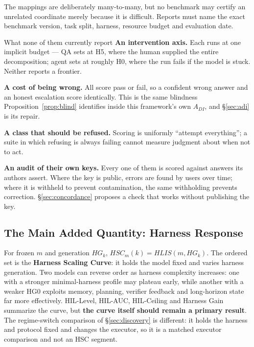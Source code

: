 \documentclass[11pt]{article}
\theoremstyle{definition}
\begin{document}
The mappings are deliberately many-to-many, but no benchmark may certify an unrelated coordinate merely because it is difficult. Reports must name the exact benchmark version, task split, harness, resource budget and evaluation date.

\begin{claimbox}{What none of them currently report}
\textbf{An intervention axis.} Each runs at one implicit budget --- QA sets at H5, where the human supplied the entire decomposition; agent sets at roughly H0, where the run fails if the model is stuck. Neither reports a frontier.

\textbf{A cost of being wrong.} All score pass or fail, so a confident wrong answer and an honest escalation score identically. This is the same blindness Proposition~\ref{prop:blind} identifies inside this framework's own $A_{DI}$, and \S\ref{sec:adi} is its repair.

\textbf{A class that should be refused.} Scoring is uniformly ``attempt everything''; a suite in which refusing is always failing cannot measure judgment about when not to act.

\textbf{An audit of their own keys.} Every one of them is scored against answers its authors assert. Where the key is public, errors are found by users over time; where it is withheld to prevent contamination, the same withholding prevents correction. \S\ref{sec:concordance} proposes a check that works without publishing the key.
\end{claimbox}

\subsection{The Main Added Quantity: Harness Response}

For frozen $m$ and generation $HG_k$, $HSC_m(k) = HLIS(m,HG_k)$. The ordered set is the \textbf{Harness Scaling Curve}: it holds the model fixed and varies harness generation. Two models can reverse order as harness complexity increases: one with a stronger minimal-harness profile may plateau early, while another with a weaker HG0 exploits memory, planning, verifier feedback and long-horizon state far more effectively. HIL-Level, HIL-AUC, HIL-Ceiling and Harness Gain summarize the curve, but \textbf{the curve itself should remain a primary result}. The regime-switch comparison of \S\ref{sec:discovery} is different: it holds the harness and protocol fixed and changes the executor, so it is a matched executor comparison and not an HSC segment.
\end{document}
